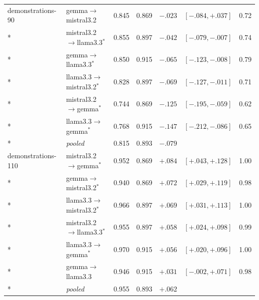 {\begin{longtable}{llrlrrr}
\addlinespace
demonstrations-90 & gemma$\to$mistral3.2 & 0.845 & 0.869 & $-.023$ & $[-.084,+.037]$ & 0.72 \\*
 & mistral3.2$\to$llama3.3$^{*}$ & 0.855 & 0.897 & $-.042$ & $[-.079,-.007]$ & 0.74 \\*
 & gemma$\to$llama3.3$^{*}$ & 0.850 & 0.915 & $-.065$ & $[-.123,-.008]$ & 0.79 \\*
 & llama3.3$\to$mistral3.2$^{*}$ & 0.828 & 0.897 & $-.069$ & $[-.127,-.011]$ & 0.71 \\*
 & mistral3.2$\to$gemma$^{*}$ & 0.744 & 0.869 & $-.125$ & $[-.195,-.059]$ & 0.62 \\*
 & llama3.3$\to$gemma$^{*}$ & 0.768 & 0.915 & $-.147$ & $[-.212,-.086]$ & 0.65 \\*
 & \emph{pooled} & 0.815 & 0.893 & $-.079$ & & \\
\addlinespace
demonstrations-110 & mistral3.2$\to$gemma$^{*}$ & 0.952 & 0.869 & $+.084$ & $[+.043,+.128]$ & 1.00 \\*
 & gemma$\to$mistral3.2$^{*}$ & 0.940 & 0.869 & $+.072$ & $[+.029,+.119]$ & 0.98 \\*
 & llama3.3$\to$mistral3.2$^{*}$ & 0.966 & 0.897 & $+.069$ & $[+.031,+.113]$ & 1.00 \\*
 & mistral3.2$\to$llama3.3$^{*}$ & 0.955 & 0.897 & $+.058$ & $[+.024,+.098]$ & 0.99 \\*
 & llama3.3$\to$gemma$^{*}$ & 0.970 & 0.915 & $+.056$ & $[+.020,+.096]$ & 1.00 \\*
 & gemma$\to$llama3.3 & 0.946 & 0.915 & $+.031$ & $[-.002,+.071]$ & 0.98 \\*
 & \emph{pooled} & 0.955 & 0.893 & $+.062$ & & \\
\end{longtable}}
